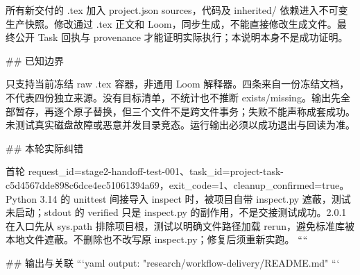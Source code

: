 所有新交付的 .tex 加入 project.json sources，代码及 inherited/ 依赖进入不可变生产快照。修改通过 .tex 正文和 Loom，同步生成，不能直接修改生成文件。最终公开 Task 回执与 provenance 才能证明实际执行；本说明本身不是成功证明。

## 已知边界

只支持当前冻结 raw .tex 容器，非通用 Loom 解释器。四条来自一份冻结文档，不代表四份独立来源。没有目标清单，不统计也不推断 exists/missing。输出先全部暂存，再逐个原子替换，但三个文件不是跨文件事务；失败不能声称成套成功。未测试真实磁盘故障或恶意并发目录竞态。运行输出必须以成功退出与回读为准。

## 本轮实际纠错

首轮 request_id=stage2-handoff-test-001、task_id=project-task-c5d4567dde898c6dce4ec51061394a69，exit_code=1、cleanup_confirmed=true。Python 3.14 的 unittest 间接导入 inspect 时，被项目自带 inspect.py 遮蔽，测试未启动；stdout 的 verified 只是 inspect.py 的副作用，不是交接测试成功。2.0.1 在入口先从 sys.path 排除项目根，测试以明确文件路径加载 rerun，避免标准库被本地文件遮蔽。不删除也不改写原 inspect.py；修复后须重新实跑。
````

## 输出与关联
```yaml
output: "research/workflow-delivery/README.md"
```

